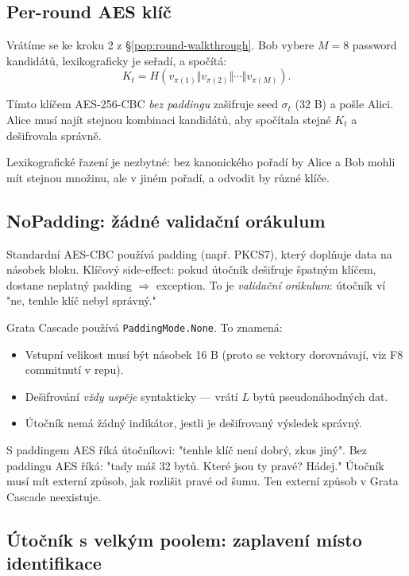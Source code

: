 \documentclass[11pt,a4paper]{article}
\begin{document}
\subsection{Per-round AES klíč}

Vrátíme se ke kroku 2 z §\ref{pop:round-walkthrough}. Bob vybere $M = 8$ password kandidátů, lexikograficky je seřadí, a spočítá:
\[
K_t = H(v_{\pi(1)} \Vert v_{\pi(2)} \Vert \cdots \Vert v_{\pi(M)}).
\]

Tímto klíčem AES-256-CBC \emph{bez paddingu} zašifruje seed $\sigma_t$ (32 B) a pošle Alici. Alice musí najít stejnou kombinaci kandidátů, aby spočítala stejné $K_t$ a dešifrovala správně.

Lexikografické řazení je nezbytné: bez kanonického pořadí by Alice a Bob mohli mít stejnou množinu, ale v jiném pořadí, a odvodit by různé klíče.

\subsection{NoPadding: žádné validační orákulum}

Standardní AES-CBC používá padding (např. PKCS7), který doplňuje data na násobek bloku. Klíčový side-effect: pokud útočník dešifruje špatným klíčem, dostane neplatný padding $\Rightarrow$ exception. To je \emph{validační orákulum}: útočník ví "ne, tenhle klíč nebyl správný."

Grata Cascade používá \texttt{PaddingMode.None}. To znamená:
\begin{itemize}[leftmargin=*]
\item Vstupní velikost musí být násobek 16 B (proto se vektory dorovnávají, viz F8 commitnutí v repu).
\item Dešifrování \emph{vždy uspěje} syntakticky --- vrátí $L$ bytů pseudonáhodných dat.
\item Útočník nemá žádný indikátor, jestli je dešifrovaný výsledek správný.
\end{itemize}

\begin{aha}
S paddingem AES říká útočníkovi: "tenhle klíč není dobrý, zkus jiný". Bez paddingu AES říká: "tady máš 32 bytů. Které jsou ty pravé? Hádej." Útočník musí mít externí způsob, jak rozlišit pravé od šumu. Ten externí způsob v Grata Cascade neexistuje.
\end{aha}

\subsection{Útočník s velkým poolem: zaplavení místo identifikace}
\end{document}
